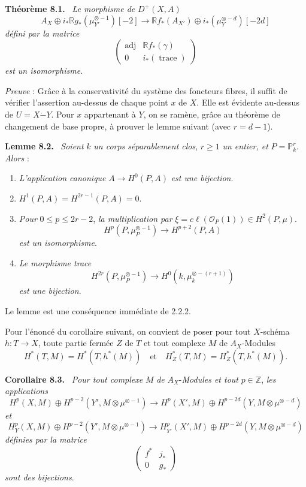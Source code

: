 \documentclass[11pt]{article}
\newenvironment{statement}[1]{\par\medskip\noindent\textbf{#1.}\ }{\par\medskip}
\newcommand{\R}{\mathbb{R}}\newcommand{\RHomCore}{\mathbb{R}\mathrm{Hom}}
\providecommand{\R}{\mathrm R}
\begin{document}
\begin{statement}{Théorème 8.1}
\emph{Le morphisme de} $D^+(X,A)$
\[
A_X\oplus i_*\R g_*(\mu_{Y'}^{\otimes -1})[-2]\to
\R f_*(A_{X'})\oplus i_*(\mu_Y^{\otimes -d})[-2d]
\tag{8.1.1}
\]
\emph{défini par la matrice}
\[
\begin{pmatrix}
\operatorname{adj}&\R f_*(\gamma)\\
0&i_*(\operatorname{trace})
\end{pmatrix}
\]
\emph{est un isomorphisme}.
\end{statement}

\emph{Preuve} : Grâce à la conservativité du système des foncteurs fibres, il suffit de vérifier l'assertion au-dessus de chaque point $x$ de $X$. Elle est évidente au-dessus de $U=X\mathbin{\dot{-}}Y$. Pour $x$ appartenant à $Y$, on se ramène, grâce au théorème de changement de base propre, à prouver le lemme suivant (avec $r=d-1$).

\begin{statement}{Lemme 8.2}
\emph{Soient} $k$ \emph{un corps séparablement clos}, $r\ge1$ \emph{un entier, et} $P=\mathbb P_k^r$. \emph{Alors} :
\begin{enumerate}[label=\alph*)]
\item \emph{L'application canonique} $A\to H^0(P,A)$ \emph{est une bijection}.
\item $H^1(P,A)=H^{2r-1}(P,A)=0$.
\item
\emph{Pour} $0\le p\le2r-2$, \emph{la multiplication par} $\xi=c\ell(\mathcal O_P(1))\in H^2(P,\mu)$.
\[
H^p(P,\mu_P^{\otimes -1})\to H^{p+2}(P,A)
\]
\emph{est un isomorphisme}.
\item \emph{Le morphisme trace}
\[
H^{2r}(P,\mu_P^{\otimes -1})\to H^0(k,\mu_k^{\otimes -(r+1)})
\]
\emph{est une bijection}.
\end{enumerate}
\end{statement}

Le lemme est une conséquence immédiate de 2.2.2.

Pour l'énoncé du corollaire suivant, on convient de poser pour tout $X$-schéma $h:T\to X$, toute partie fermée $Z$ de $T$ et tout complexe $M$ de $A_X$-Modules
\[
H^*(T,M)=H^*(T,h^*(M))
\quad\text{et}\quad
H^*_Z(T,M)=H^*_Z(T,h^*(M)).
\]

\begin{statement}{Corollaire 8.3}
\emph{Pour tout complexe} $M$ \emph{de} $A_X$-\emph{Modules et tout} $p\in\mathbb Z$, \emph{les applications}
\[
H^p(X,M)\oplus H^{p-2}(Y',M\otimes\mu^{\otimes -1})
\to
H^p(X',M)\oplus H^{p-2d}(Y,M\otimes\mu^{\otimes -d})
\tag{8.3.1.}
\]
\emph{et}
\[
H_Y^p(X,M)\oplus H^{p-2}(Y',M\otimes\mu^{\otimes -1})
\to
H_{Y'}^p(X',M)\oplus H^{p-2d}(Y,M\otimes\mu^{\otimes -d})
\tag{8.3.2}
\]
\emph{définies par la matrice}
\[
\begin{pmatrix}
f^*&j_*\\
0&g_*
\end{pmatrix}
\]
\emph{sont des bijections}.
\end{statement}
\end{document}
